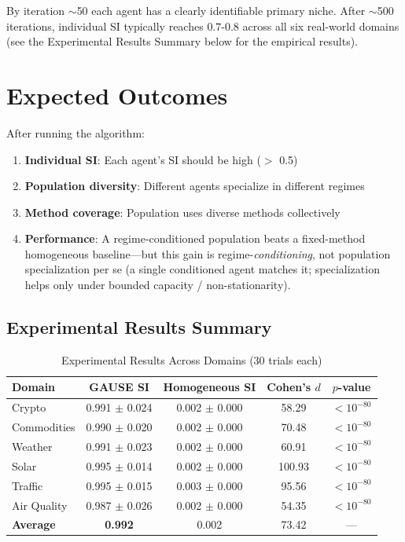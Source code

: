 \documentclass[11pt,a4paper]{article}
\theoremstyle{definition}
\theoremstyle{plain}
\begin{document}
By iteration $\sim$50 each agent has a clearly identifiable primary niche.
After $\sim$500 iterations, individual SI typically reaches $0.7$-$0.8$
across all six real-world domains (see the Experimental Results Summary
below for the empirical results).

\section{Expected Outcomes}

After running the algorithm:

\begin{enumerate}
    \item \textbf{Individual SI}: Each agent's SI should be high ($>$ 0.5)
    \item \textbf{Population diversity}: Different agents specialize in different regimes
    \item \textbf{Method coverage}: Population uses diverse methods collectively
    \item \textbf{Performance}: A regime-conditioned population beats a fixed-method homogeneous baseline---but this gain is regime-\emph{conditioning}, not population specialization per se (a single conditioned agent matches it; specialization helps only under bounded capacity / non-stationarity).
\end{enumerate}

\subsection{Experimental Results Summary}

\begin{table}[h]
\centering
\caption{Experimental Results Across Domains (30 trials each)}
\begin{tabular}{l|ccc|c}
\toprule
Domain & GAUSE SI & Homogeneous SI & Cohen's $d$ & $p$-value \\
\midrule
Crypto & 0.991 $\pm$ 0.024 & 0.002 $\pm$ 0.000 & 58.29 & $<10^{-80}$ \\
Commodities & 0.990 $\pm$ 0.020 & 0.002 $\pm$ 0.000 & 70.48 & $<10^{-80}$ \\
Weather & 0.991 $\pm$ 0.023 & 0.002 $\pm$ 0.000 & 60.91 & $<10^{-80}$ \\
Solar & 0.995 $\pm$ 0.014 & 0.002 $\pm$ 0.000 & 100.93 & $<10^{-80}$ \\
Traffic & 0.995 $\pm$ 0.015 & 0.003 $\pm$ 0.000 & 95.56 & $<10^{-80}$ \\
Air Quality & 0.987 $\pm$ 0.026 & 0.002 $\pm$ 0.000 & 54.35 & $<10^{-80}$ \\
\midrule
\textbf{Average} & \textbf{0.992} & 0.002 & 73.42 & --- \\
\bottomrule
\end{tabular}
\end{table}
\end{document}
